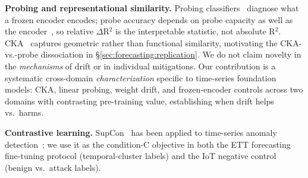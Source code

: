 \textbf{Probing and representational similarity.}
Probing classifiers~\cite{hewitt2019structural} diagnose what a
frozen encoder encodes; probe accuracy depends on probe capacity as
well as the encoder~\cite{pimentel2020information}, so relative
$\Delta$R$^2$ is the interpretable statistic, not absolute R$^2$.
CKA~\cite{kornblith2019cka} captures geometric rather than functional
similarity, motivating the CKA-vs.-probe dissociation in
\S\ref{sec:forecasting:replication}.
We do not claim novelty in the \emph{mechanisms} of drift or in
individual mitigations.
Our contribution is a systematic cross-domain \emph{characterization}
specific to time-series foundation models: CKA, linear probing,
weight drift, and frozen-encoder controls across two domains
with contrasting pre-training value, establishing when drift
helps vs.\ harms.

\textbf{Contrastive learning.}
SupCon~\cite{khosla2020supcon} has been applied to time-series
anomaly detection~\cite{eldele2021ts2vec}; we use it as the
condition-C objective in both the ETT forecasting fine-tuning
protocol (temporal-cluster labels) and the IoT negative control
(benign vs.\ attack labels).
